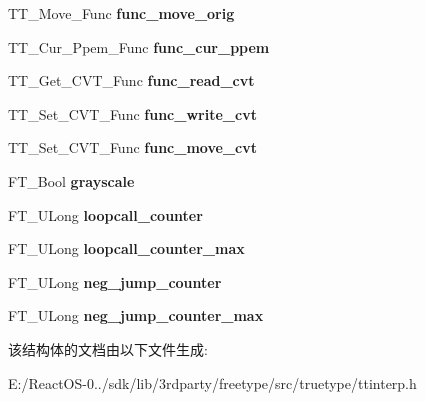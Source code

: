 \begin{DoxyCompactItemize}
\item 
\mbox{\label{struct_t_t___exec_context_rec___a877fce20a22f66d9adf1e1dfa90d2f3e}} 
T\+T\+\_\+\+Move\+\_\+\+Func {\bfseries func\+\_\+move\+\_\+orig}
\item 
\mbox{\label{struct_t_t___exec_context_rec___aa776c397d99d4332adbcba20f7f4cdc1}} 
T\+T\+\_\+\+Cur\+\_\+\+Ppem\+\_\+\+Func {\bfseries func\+\_\+cur\+\_\+ppem}
\item 
\mbox{\label{struct_t_t___exec_context_rec___a0a65a6393026e037f608b1e14bd144ac}} 
T\+T\+\_\+\+Get\+\_\+\+C\+V\+T\+\_\+\+Func {\bfseries func\+\_\+read\+\_\+cvt}
\item 
\mbox{\label{struct_t_t___exec_context_rec___aeb9e3b2d74d13513d06cbcb82b8039cf}} 
T\+T\+\_\+\+Set\+\_\+\+C\+V\+T\+\_\+\+Func {\bfseries func\+\_\+write\+\_\+cvt}
\item 
\mbox{\label{struct_t_t___exec_context_rec___a97902f83425631d26514e83352f31764}} 
T\+T\+\_\+\+Set\+\_\+\+C\+V\+T\+\_\+\+Func {\bfseries func\+\_\+move\+\_\+cvt}
\item 
\mbox{\label{struct_t_t___exec_context_rec___ac1f64528bb3710e5ad08bc0d3333011e}} 
F\+T\+\_\+\+Bool {\bfseries grayscale}
\item 
\mbox{\label{struct_t_t___exec_context_rec___a1e759f5666b07b15c996c6e712be42d0}} 
F\+T\+\_\+\+U\+Long {\bfseries loopcall\+\_\+counter}
\item 
\mbox{\label{struct_t_t___exec_context_rec___ac4ae9e62d15086a9eaa26ae9e376344f}} 
F\+T\+\_\+\+U\+Long {\bfseries loopcall\+\_\+counter\+\_\+max}
\item 
\mbox{\label{struct_t_t___exec_context_rec___ac7d3d938281fbe92fd7afb6d62faf834}} 
F\+T\+\_\+\+U\+Long {\bfseries neg\+\_\+jump\+\_\+counter}
\item 
\mbox{\label{struct_t_t___exec_context_rec___a4cab699335ddac777bb71d048b2f53fb}} 
F\+T\+\_\+\+U\+Long {\bfseries neg\+\_\+jump\+\_\+counter\+\_\+max}
\end{DoxyCompactItemize}


该结构体的文档由以下文件生成\+:\begin{DoxyCompactItemize}
\item 
E\+:/\+React\+O\+S-\/0../sdk/lib/3rdparty/freetype/src/truetype/ttinterp.\+h\end{DoxyCompactItemize}
